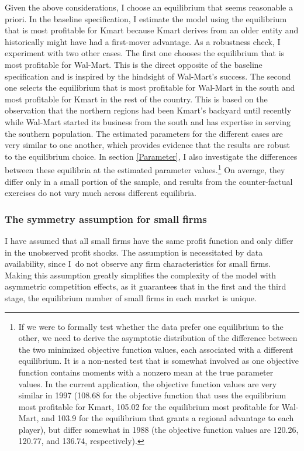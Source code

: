 \documentclass[notitlepage,onecolumn,11pt]{article}
\begin{document}
Given the above considerations, I choose an equilibrium that seems
reasonable a priori. In the baseline specification, I estimate the model
using the equilibrium that is most profitable for Kmart because Kmart
derives from an older entity and historically might have had a first-mover
advantage. As a robustness check, I experiment with two other cases. The
first one chooses the equilibrium that is most profitable for Wal-Mart. This
is the direct opposite of the baseline specification and is inspired by the
hindsight of Wal-Mart's success. The second one selects the equilibrium that
is most profitable for Wal-Mart in the south and most profitable for Kmart
in the rest of the country. This is based on the observation that the
northern regions had been Kmart's backyard until recently while Wal-Mart
started its business from the south and has expertise in serving the
southern population. The estimated parameters for the different cases are
very similar to one another, which provides evidence that the results are
robust to the equilibrium choice. In section \ref{Parameter}, I also
investigate the differences between these equilibria at the estimated
parameter values.\footnote{%
If we were to formally test whether the data prefer one equilibrium to the
other, we need to derive the asymptotic distribution of the difference
between the two minimized objective function values, each associated with a
different equilibrium. It is a non-nested test that is somewhat involved as
one objective function contains moments with a nonzero mean at the true
parameter values. In the current application, the objective function values
are very similar in 1997 (108.68 for the objective function that uses the
equilibrium most profitable for Kmart, 105.02 for the equilibrium most
profitable for Wal-Mart, and 103.9 for the equilibrium that grants a
regional advantage to each player), but differ somewhat in 1988 (the
objective function values are 120.26, 120.77, and 136.74, respectively).
\par
{}} On average, they differ only in a small portion of the sample, and
results from the counter-factual exercises do not vary much across different
equilibria.

\subsubsection{The symmetry assumption for small firms}

I have assumed that all small firms have the same profit function and only
differ in the unobserved profit shocks. The assumption is necessitated by
data availability, since I\ do not observe any firm characteristics for
small firms. Making this assumption greatly simplifies the complexity of the
model with asymmetric competition effects, as it guarantees that in the
first and the third stage, the equilibrium number of small firms in each
market is unique.
\end{document}
